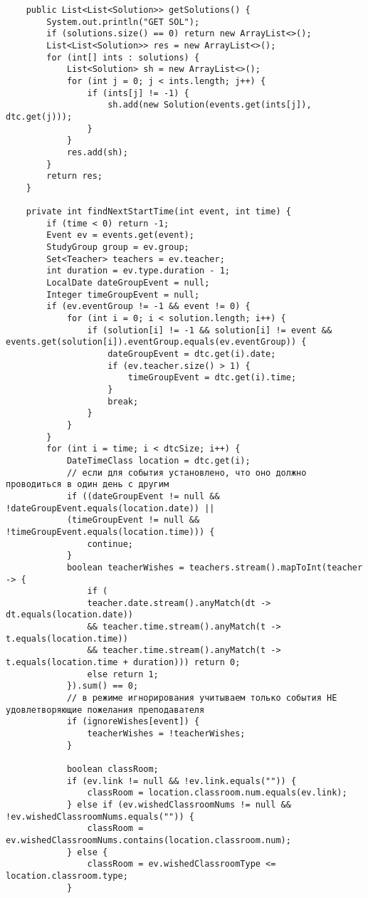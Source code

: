 \begin{lstlisting}
	public List<List<Solution>> getSolutions() {
		System.out.println("GET SOL");
		if (solutions.size() == 0) return new ArrayList<>();
		List<List<Solution>> res = new ArrayList<>();
		for (int[] ints : solutions) {
			List<Solution> sh = new ArrayList<>();
			for (int j = 0; j < ints.length; j++) {
				if (ints[j] != -1) {
					sh.add(new Solution(events.get(ints[j]), dtc.get(j)));
				}
			}
			res.add(sh);
		}
		return res;
	}
	
	private int findNextStartTime(int event, int time) {
		if (time < 0) return -1;
		Event ev = events.get(event);
		StudyGroup group = ev.group;
		Set<Teacher> teachers = ev.teacher;
		int duration = ev.type.duration - 1;
		LocalDate dateGroupEvent = null;
		Integer timeGroupEvent = null;
		if (ev.eventGroup != -1 && event != 0) {
			for (int i = 0; i < solution.length; i++) {
				if (solution[i] != -1 && solution[i] != event && events.get(solution[i]).eventGroup.equals(ev.eventGroup)) {
					dateGroupEvent = dtc.get(i).date;
					if (ev.teacher.size() > 1) {
						timeGroupEvent = dtc.get(i).time;
					}
					break;
				}
			}
		}
		for (int i = time; i < dtcSize; i++) {
			DateTimeClass location = dtc.get(i);
			// если для события установлено, что оно должно проводиться в один день с другим
			if ((dateGroupEvent != null && !dateGroupEvent.equals(location.date)) ||
			(timeGroupEvent != null && !timeGroupEvent.equals(location.time))) {
				continue;
			}
			boolean teacherWishes = teachers.stream().mapToInt(teacher -> {
				if (
				teacher.date.stream().anyMatch(dt -> dt.equals(location.date))
				&& teacher.time.stream().anyMatch(t -> t.equals(location.time))
				&& teacher.time.stream().anyMatch(t -> t.equals(location.time + duration))) return 0;
				else return 1;
			}).sum() == 0;
			// в режиме игнорирования учитываем только события НЕ удовлетворяющие пожелания преподавателя
			if (ignoreWishes[event]) {
				teacherWishes = !teacherWishes;
			}
			
			boolean classRoom;
			if (ev.link != null && !ev.link.equals("")) {
				classRoom = location.classroom.num.equals(ev.link);
			} else if (ev.wishedClassroomNums != null && !ev.wishedClassroomNums.equals("")) {
				classRoom = ev.wishedClassroomNums.contains(location.classroom.num);
			} else {
				classRoom = ev.wishedClassroomType <= location.classroom.type;
			}
			

\end{lstlisting}
